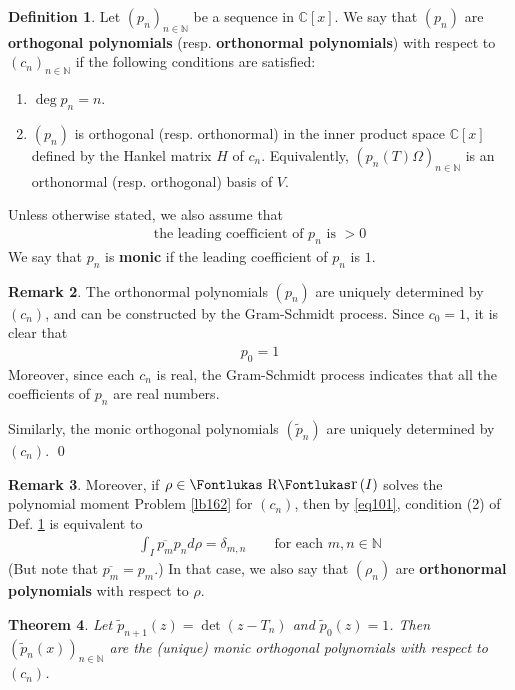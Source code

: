 \documentclass[12pt,b5paper,notitlepage]{article}
\theoremstyle{definition}
\newtheorem{df}{Definition}[section]
\newtheorem{rem}[df]{Remark}
\theoremstyle{plain}
\newtheorem{thm}[df]{Theorem}
\DeclareMathOperator{\Rr}{\text{\Fontlukas R}\text{\kern -0pt {\Fontlukas\large r}}\,}
\newcommand{\wtd}{\widetilde}
\newcommand{\ovl}{\overline}
\newcommand{\Cbb}{\mathbb C}
\newcommand{\Nbb}{\mathbb N}
\numberwithin{equation}{section}
\begin{document}
\begin{df}\label{lb190}
Let $(p_n)_{n\in\Nbb}$ be a sequence in $\Cbb[x]$. We say that $(p_n)$ are \textbf{orthogonal polynomials} (resp. \textbf{orthonormal polynomials})  with respect to $(c_n)_{n\in\Nbb}$ if the following conditions are satisfied:
\begin{enumerate}[label=(\arabic*)]
\item $\deg p_n=n$.
\item $(p_n)$ is orthogonal (resp. orthonormal) in the inner product space $\Cbb[x]$ defined by the Hankel matrix $H$ of $c_n$. Equivalently, $(p_n(T)\Omega)_{n\in\Nbb}$ is an orthonormal (resp. orthogonal) basis of $V$.
\end{enumerate}
Unless otherwise stated, we also assume that
\begin{align}
\text{the leading coefficient of $p_n$ is $>0$}
\end{align}
We say that $p_n$ is \textbf{monic} if the leading coefficient of $p_n$ is $1$.
\end{df}

\begin{rem}
The orthonormal polynomials $(p_n)$ are uniquely determined by $(c_n)$, and can be constructed by the Gram-Schmidt process. Since $c_0=1$, it is clear that
\begin{align*}
p_0=1
\end{align*}
Moreover, since each $c_n$ is real, the Gram-Schmidt process indicates that all the coefficients of $p_n$ are real numbers.

Similarly, the monic orthogonal polynomials $(\wtd p_n)$ are uniquely determined by $(c_n)$.   \hfill\qed
\end{rem}


\begin{rem}
Moreover, if $\rho\in\Rr(I)$ solves the polynomial moment Problem \ref{lb162} for $(c_n)$, then by \eqref{eq101}, condition (2) of Def. \ref{lb190} is equivalent to
\begin{align}
\int_I \ovl{p_m}p_n d\rho=\delta_{m,n}\qquad\text{for each }m,n\in\Nbb
\end{align}
(But note that $\ovl{p_m}=p_m$.) In that case, we also say that $(\rho_n)$ are \textbf{orthonormal polynomials} with respect to $\rho$.
\end{rem}



\begin{thm}\label{lb196}
Let $\wtd p_{n+1}(z)=\det(z-T_n)$ and $\wtd p_0(z)=1$. Then $(\wtd p_n(x))_{n\in\Nbb}$ are the (unique) monic orthogonal polynomials with respect to $(c_n)$.
\end{thm}
\end{document}
